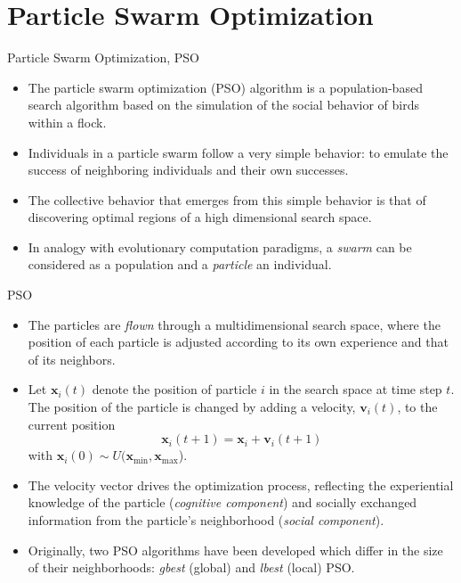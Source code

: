\documentclass[aspectratio=169,compress,10pt]{beamer}
\begin{document}
\section{Particle Swarm Optimization}
\begin{frame}{Particle Swarm Optimization, PSO}
\begin{itemize}
	\item The particle swarm optimization (PSO) algorithm is a population-based search algorithm based on the simulation of the social behavior of birds within a flock.
	\item Individuals in a particle swarm follow a very simple behavior: to emulate the success of neighboring individuals and their own successes.
	\item The collective behavior that emerges from this simple behavior is that of discovering optimal regions of a high dimensional search space.
	\item In analogy with evolutionary computation paradigms, a \emph{swarm} can be considered as a population and a \emph{particle} an individual.
\end{itemize}
\end{frame}

\begin{frame}{PSO}
\begin{itemize}
	\item The particles are \emph{flown} through a multidimensional search space, where the position of each particle is adjusted according to its own experience and that of its neighbors.
	\item Let $\mathbf{x}_i(t)$ denote the position of particle $i$ in the search space at time step $t$. The position of the particle is changed
by adding a velocity, $\mathbf{v}_i(t)$, to the current position
\begin{equation}
	\mathbf{x}_i(t+1) = \mathbf{x}_i + \mathbf{v}_i(t+1)
	\label{eq:velocidad-particula-generica}
\end{equation}
with $\mathbf{x}_i(0) \sim U(\mathbf{x}_\text{min},\mathbf{x}_\text{max}$).
	\item The velocity vector drives the optimization process, reflecting the experiential knowledge of the particle (\emph{cognitive component}) and socially exchanged information from the particle's neighborhood (\emph{social component}).
	\item Originally, two PSO algorithms have been developed which differ in the size of their neighborhoods: \emph{gbest} (global) and \emph{lbest} (local) PSO.
\end{itemize}
\end{frame}
\end{document}
